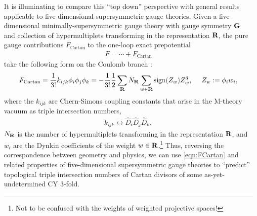 \documentclass[11pt,oneside,english]{article}
\numberwithin{equation}{section}
\theoremstyle{definition}
\begin{document}
 It is illuminating to compare this ``top down'' perspective with general results applicable to five-dimensional supersymmetric gauge theories. Given a five-dimensional minimally-supersymmetric gauge theory with gauge symmetry $\textbf G$ and collection of hypermultiplets transforming in the representation $\textbf R$, the pure gauge contributions $ F_{\text{Cartan}}$ to the one-loop exact prepotential 
 	\begin{align}
		 F = \cdots +  F_{\text{Cartan}}
	\end{align}
take the following form on the Coulomb branch \cite{Witten:1996qb,Intriligator:1997pq,Grimm:2013oga,Bonetti:2013ela}:
	\begin{align}
	\begin{split}
	\label{eqn:FCartan}
		 F_{\text{Cartan}} =\frac{1}{3!}k_{ijk} \phi_i \phi_j \phi_k = -\frac{1}{3!} \frac{1}{2} \sum_{\textbf R} N_{\textbf R} \sum_{w \in \textbf R} \text{sign}(Z_w) Z_w^3,~~~~ Z_w := \phi_i w_i,
	\end{split}
	\end{align}
where the $k_{ijk}$ are Chern-Simons coupling constants that arise in the M-theory vacuum as triple intersection numbers,
	\begin{align}
	\label{eqn:CScouplings}
		k_{ijk} \longleftrightarrow \hat D_i  \hat D_j  \hat D_k,
	\end{align}	
 $N_{\textbf R}$ is the number of hypermultiplets transforming in the representation $\textbf R$, and $w_i$ are the Dynkin coefficients of the weight $w \in \textbf R$.\footnote{Not to be confused with the weights of weighted projective spaces!} Thus, reversing the correspondence between geometry and physics, we can use \cref{eqn:FCartan} and related properties of five-dimensional supersymmetric gauge theories to ``predict'' topological triple intersection numbers of Cartan divisors of some as-yet-undetermined CY 3-fold.
\end{document}
